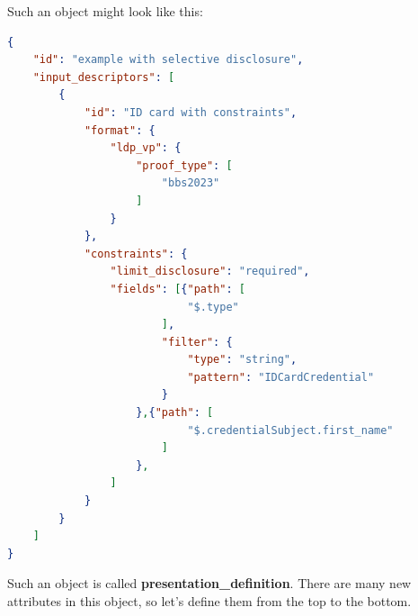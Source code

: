 \documentclass[
	a4paper               %
	,BCOR=0mm            %
	,bibliography=totoc   %
	,listof=totoc         %
	,monolingual
	,twoside=false
]{bfhthesis}              %
\begin{document}
Such an object might look like this:
\begin{lstlisting}[language=json,firstnumber=1,caption={Example of a presentation definition},captionpos=b, label={list:presdef}]
{
	"id": "example with selective disclosure",
	"input_descriptors": [
		{
			"id": "ID card with constraints",
			"format": {
				"ldp_vp": {
					"proof_type": [
						"bbs2023"
					]
				}
			},
			"constraints": {
				"limit_disclosure": "required",
				"fields": [{"path": [
							"$.type"
						],
						"filter": {
							"type": "string",
							"pattern": "IDCardCredential"
						}
					},{"path": [
							"$.credentialSubject.first_name"
						]
					},
				]
			}
		}
	]
}
\end{lstlisting}

Such an object is called \textbf{presentation\_definition}.
There are many new attributes in this object, so let's define them from the top to the bottom. \\
\end{document}
